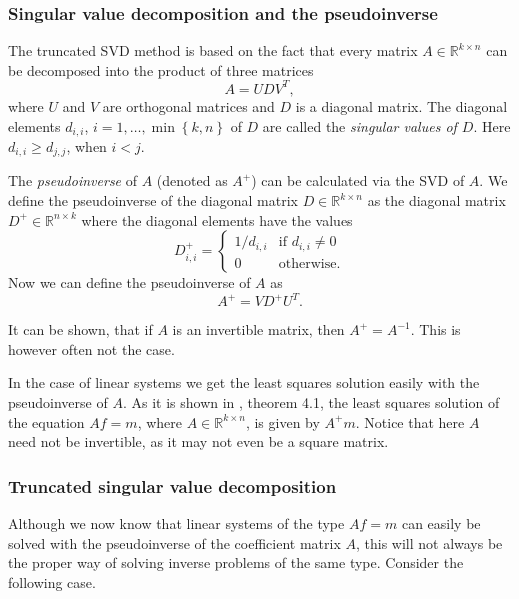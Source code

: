 \documentclass[12pt,a4]{article}
\newcommand{\R}{{\mathbb R}}
\begin{document}
\subsubsection{Singular value decomposition and the pseudoinverse}
\label{sec:svd}

The truncated SVD method is based on the fact that every matrix $A \in \R^{k \times n}$ can be decomposed into the product of three matrices
\begin{equation}
\label{eq:svd}
A = U D V^T,
\end{equation}
where $U$ and $V$ are orthogonal matrices and $D$ is a diagonal matrix. The diagonal elements $d_{i,i}$, $i = 1, \ldots , \min \left\{ k,n \right\}$ of $D$ are called the \emph{singular values of $D$}. Here $d_{i,i} \geq d_{j,j}$, when $i < j$.

The \emph{pseudoinverse} of $A$ (denoted as $A^+$) can be calculated via the SVD of $A$. We define the pseudoinverse of the diagonal matrix $D \in \R^{k \times n}$ as the diagonal matrix $D^+ \in \R^{n \times k}$ where the diagonal elements have the values
\begin{equation}
D^+_{i,i} =
\begin{cases}
    1 / d_{i,i} & \text{if }d_{i,i} \neq 0 \\
    0           & \text{otherwise}.
\end{cases}
\end{equation}
Now we can define the pseudoinverse of $A$ as 
\begin{equation}\label{pseudo}
A^+ = V D^+ U^T .
\end{equation}

It can be shown, that if $A$ is an invertible matrix, then $A^+ = A^{-1}$. This is however often not the case.

In the case of linear systems we get the least squares solution easily with the pseudoinverse of $A$. As it is shown in \cite{samu}, theorem 4.1, the least squares solution of the equation $Af = m$, where $A \in \R^{k \times n}$, is given by $A^+ m$. Notice that here $A$ need not be invertible, as it may not even be a square matrix.

\subsubsection{Truncated singular value decomposition}
\label{sec:tsvd}

Although we now know that linear systems of the type $Af = m$ can easily be solved with the pseudoinverse of the coefficient matrix $A$, this will not always be the proper way of solving inverse problems of the same type. Consider the following case.
\end{document}
